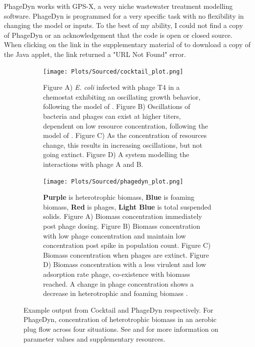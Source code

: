 PhageDyn works with GPS-X, a very niche wastewater treatment modelling software. 
PhageDyn is programmed for a very specific task with no flexibility in changing the model or inputs. 
To the best of my ability, I could not find a copy of PhageDyn or an acknowledgement that the code is open or closed source. 
When clicking on the link in the supplementary material of \citet{krysiak-baltynSimulationPhageDynamics2017} to download a copy of the Java applet, the link returned a "URL Not Found" error. 

\begin{figure}
    \centering
    \begin{subfigure}{0.49\linewidth}
        \centering
        \captionsetup{width=1\linewidth}
        \texttt{[image: Plots/Sourced/cocktail\_plot.png]}
        \caption{
            Figure A) \textit{E. coli} infected with phage T4 in a chemostat exhibiting an oscillating growth behavior, following the model of \citet{bohannanEffectResourceEnrichment1997}. 
            Figure B) Oscillations of bacteria and phages can exist at higher titers, dependent on low resource concentration, following the model of \citet{lenskiDynamicsInteractionsBacteria1988}. 
            Figure C) As the concentration of resources change, this results in increasing oscillations, but not going extinct. 
            Figure D) A system modelling the interactions with phage A and B. 
        }
        \label{fig:sourced:cocktail_plot}
    \end{subfigure}
    \hfill
    \begin{subfigure}{0.49\linewidth}
        \centering
        \captionsetup{width=1\linewidth}
        \texttt{[image: Plots/Sourced/phagedyn\_plot.png]}
        \caption{
            \textcolor[HTML]{551A8C}{\textbf{Purple}} is heterotrophic biomass, 
            \textcolor[HTML]{4580B4}{\textbf{Blue}} is foaming biomass, 
            \textcolor[HTML]{FF0000}{\textbf{Red}} is phages, 
            \textcolor[HTML]{01E6EE}{\textbf{Light Blue}} is total suspended solids. 
            Figure A) Biomass concentration immediately post phage dosing. 
            Figure B) Biomass concentration with low phage concentration and maintain low concentration post spike in population count. 
            Figure C) Biomass concentration when phages are extinct. 
            Figure D) Biomass concentration with a less virulent and low adsorption rate phage, co-existence with biomass reached. 
            A change in phage concentration shows a decrease in heterotrophic and foaming biomass \cite{krysiak-baltynSimulationPhageDynamics2017}. 
        }
        \label{fig:sourced:phagedyn_plot}
    \end{subfigure}
    \caption{Example output from Cocktail and PhageDyn respectively. For PhageDyn, concentration of heterotrophic biomass in an aerobic plug flow across four situations.
        See \citet{nilssonCocktailComputerProgram2022} and \citet{krysiak-baltynSimulationPhageDynamics2017} for more information on parameter values and supplementary resources. 
    }
    \label{fig:sourced:cocktail_and_phagedyn}
\end{figure}


